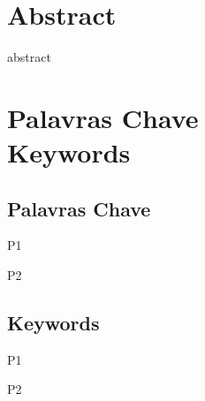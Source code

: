 \chapter*{Abstract}
\thispagestyle{empty}

abstract


\newpage
\thispagestyle{empty}


\chapter*{Palavras Chave \\ Keywords}
\thispagestyle{empty}

\section*{Palavras Chave}
{\large

\noindent P1

\noindent P2

}

\section*{Keywords}

{\large

\noindent P1

\noindent P2

}

\newpage
\thispagestyle{empty}

\cleardoublepage



\tableofcontents
\newpage

\listoffigures
\newpage

\listoftables
\newpage

\printnomenclature
\cleardoublepage



